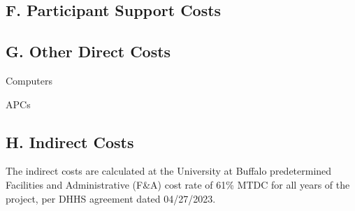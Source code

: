 
\subsection*{F. Participant Support Costs}


\subsection*{G. Other Direct Costs}


\noindent Computers

\bigskip
{}

\noindent APCs



\bigskip
{} %


\vspace{6pt}


\subsection*{H. Indirect Costs}
The indirect costs are calculated at the University at Buffalo predetermined Facilities and Administrative (F\&A) cost rate of 61\% MTDC for all years of the project, per DHHS agreement dated 04/27/2023. 
